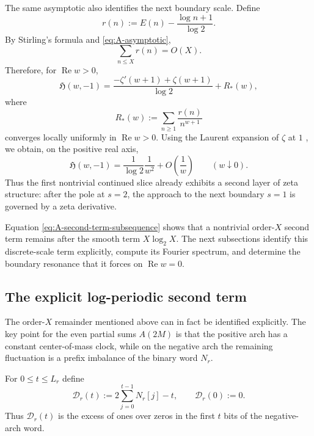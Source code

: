 \documentclass[11pt]{article}
\theoremstyle{definition}
\theoremstyle{remark}
\newcommand{\RePart}{\operatorname{Re}}
\newcommand{\Hz}{\mathfrak H}
\begin{document}
The same asymptotic also identifies the next boundary scale.  Define
\begin{equation}
r(n):=E(n)-\frac{\log n+1}{\log2}.
\label{eq:r-residual}
\end{equation}
By Stirling's formula and \eqref{eq:A-asymptotic},
\begin{equation}
\sum_{n\le X}r(n)=O(X).
\label{eq:r-partial-sums}
\end{equation}
Therefore, for \(\RePart w>0\),
\begin{equation}
{
\Hz(w,-1)
=\frac{-\zeta'(w+1)+\zeta(w+1)}{\log2}
+R_*(w),
}
\label{eq:tminus1-zeta-derivative}
\end{equation}
where
\begin{equation}
R_*(w):=\sum_{n\ge1}\frac{r(n)}{n^{w+1}}
\label{eq:Rstar}
\end{equation}
converges locally uniformly in \(\RePart w>0\).  Using the Laurent expansion
of \(\zeta\) at \(1\) \cite{Titchmarsh1986}, we obtain, on the positive real
axis,
\begin{equation}
{
\Hz(w,-1)
=\frac{1}{\log2}\frac1{w^2}+O\!\left(\frac1w\right)
\qquad(w\downarrow0).
}
\label{eq:tminus1-double-boundary}
\end{equation}
Thus the first nontrivial continued slice already exhibits a second layer of zeta structure: after the pole at \(s=2\), the approach to the next boundary \(s=1\) is governed by a zeta derivative.

Equation \eqref{eq:A-second-term-subsequence} shows that a nontrivial order-$X$ second term remains after the smooth term $X\log_2X$.  The next subsections identify this discrete-scale term explicitly, compute its Fourier spectrum, and determine the boundary resonance that it forces on $\RePart w=0$.

\subsection{The explicit log-periodic second term}

The order-$X$ remainder mentioned above can in fact be identified explicitly.
The key point for the even partial sums $A(2M)$ is that the positive arch
has a constant center-of-mass clock, while on the negative arch the
remaining fluctuation is a prefix imbalance of the binary word $N_r$.

For $0\le t\le L_r$ define
\begin{equation}
\mathscr D_r(t)
:=2\sum_{j=0}^{t-1}N_r[j]-t,
\qquad \mathscr D_r(0):=0.
\label{eq:negative-prefix-imbalance}
\end{equation}
Thus $\mathscr D_r(t)$ is the excess of ones over zeros in the first $t$
bits of the negative-arch word.
\end{document}

